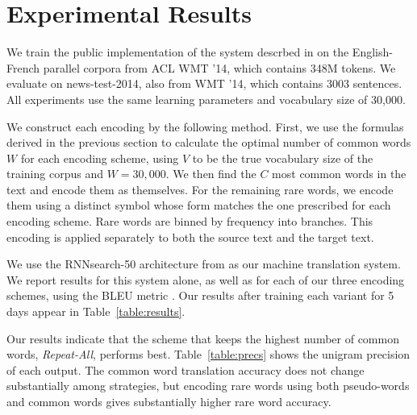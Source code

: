 \section{Experimental Results}
\label{sec:exp}

We train the public implementation of the system descrbed in
 on the English-French parallel corpora
from ACL WMT '14, which contains 348M tokens. We evaluate on news-test-2014,
also from WMT '14, which contains 3003 sentences. All experiments use the same
learning parameters and vocabulary size of 30,000.

We construct each encoding by the following method. First, we use the formulas
derived in the previous section to calculate the optimal number of common words
$W$ for each encoding scheme, using $V$ to be the true vocabulary size of the
training corpus and $W = 30,000$. We then find the $C$ most common words in the
text and encode them as themselves. For the remaining rare words, we encode
them using a distinct symbol whose form matches the one prescribed for each
encoding scheme. Rare words are binned by frequency into branches. This encoding is
applied separately to both the source text and the target text.

We use the RNNsearch-50 architecture from 
as our machine translation system. We report results for this system alone, as
well as for each of our three encoding schemes, using the BLEU metric
\cite{bleu}. Our results after training each variant for 5 days appear in
Table~\ref{table:results}.

Our results indicate that the scheme that keeps the highest number of common
words, \emph{Repeat-All}, performs best. Table~\ref{table:precs} shows the
unigram precision of each output. The common word translation accuracy does not
change substantially among strategies, but encoding rare words using both
pseudo-words and common words gives substantially higher rare word accuracy.

\begin{table}
  \centering
  \vspace{8pt}
  \caption{BLEU scores (\%) on detokenized test set for each encoding
    scheme after training for 5 days.}
  \label{table:results}
\end{table}

